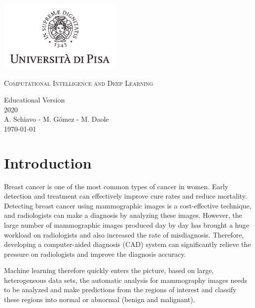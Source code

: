 \documentclass{book}
\begin{document}
    \begin{titlepage}
        \centering
        \includegraphics[width=6cm]{logo-unipi.png}
        \vfill
        \vspace{1.5cm}
        {\huge\textsc{Computational Intelligence and Deep Learning}\par}
        {\Large
            Educational Version\\
            2020\\
            \vspace{2cm}
            A. Schiavo - M. Gómez - M. Daole \\
            \vspace{2cm}
            \today
        }    
        \vfill
        \vfill
    \end{titlepage}
    \tableofcontents


    \chapter{Introduction}

    Breast cancer is one of the most common types of cancer in women. Early detection and treatment can effectively improve cure rates and reduce mortality. Detecting breast cancer using mammographic images is a cost-effective technique, and radiologists can make a diagnosis by analyzing these images. However, the large number of mammographic images produced day by day has brought a huge workload on radiologists and also increased the rate of misdiagnosis. Therefore, developing a computer-aided diagnosis (CAD) system can significantly relieve the pressure on radiologists and improve the diagnosis accuracy.
    
    Machine learning therefore quickly enters the picture, based on large, heterogeneous data sets, the automatic analysis for mammography images needs to be analyzed and make predictions from the regions of interest and classify these regions into normal or abnormal (benign and malignant).
    
\end{document}
